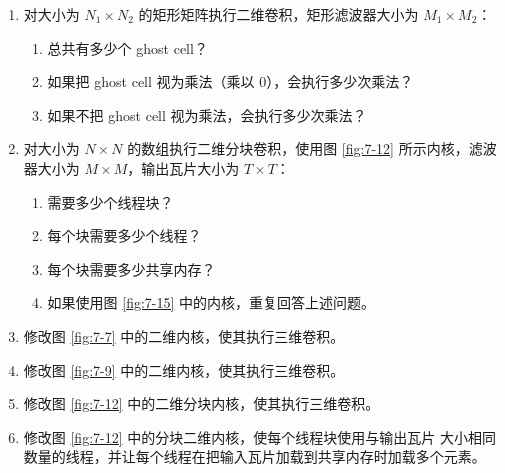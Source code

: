 \begin{enumerate}[label=\arabic*.,leftmargin=2.7em]
  \item 对大小为 $N_1\times N_2$ 的矩形矩阵执行二维卷积，矩形滤波器大小为
  $M_1\times M_2$：
  \begin{enumerate}[label=\alph*.,leftmargin=2.2em]
    \item 总共有多少个 ghost cell？
    \item 如果把 ghost cell 视为乘法（乘以 0），会执行多少次乘法？
    \item 如果不把 ghost cell 视为乘法，会执行多少次乘法？
  \end{enumerate}

  \item 对大小为 $N\times N$ 的数组执行二维分块卷积，使用图
  \ref{fig:7-12} 所示内核，滤波器大小为 $M\times M$，输出瓦片大小为
  $T\times T$：
  \begin{enumerate}[label=\alph*.,leftmargin=2.2em]
    \item 需要多少个线程块？
    \item 每个块需要多少个线程？
    \item 每个块需要多少共享内存？
    \item 如果使用图 \ref{fig:7-15} 中的内核，重复回答上述问题。
  \end{enumerate}

  \item 修改图 \ref{fig:7-7} 中的二维内核，使其执行三维卷积。

  \item 修改图 \ref{fig:7-9} 中的二维内核，使其执行三维卷积。

  \item 修改图 \ref{fig:7-12} 中的二维分块内核，使其执行三维卷积。

  \item 修改图 \ref{fig:7-12} 中的分块二维内核，使每个线程块使用与输出瓦片
  大小相同数量的线程，并让每个线程在把输入瓦片加载到共享内存时加载多个元素。
\end{enumerate}
